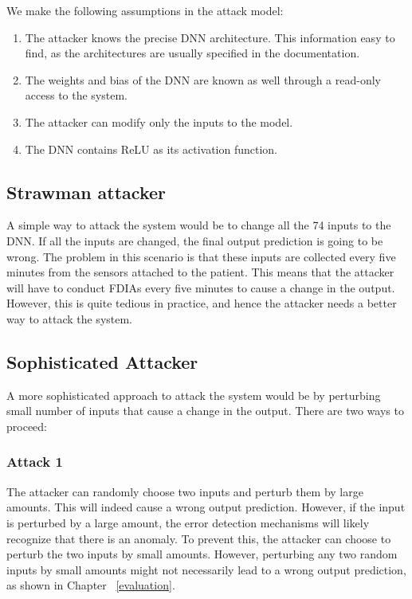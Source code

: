 We make the following assumptions in the attack model:
\begin{enumerate}
	\item The attacker knows the precise \ac{DNN}  architecture. This information easy to find, as the architectures are  usually specified in the  documentation. 
	\item  The weights and bias of the \ac{DNN}  are known as well through a read-only access to the system.  
	\item The attacker can modify only the inputs to the model.
	\item The \ac{DNN} contains ReLU as its activation function. 
\end{enumerate}

\subsection{Strawman attacker}
A simple way to attack the system would be to change all the 74 inputs to the DNN.
 If all the inputs are changed, the final output prediction is going to be wrong. The problem in this  scenario is that 
 these inputs are collected every five minutes from the sensors attached to the patient. 
 This means that the attacker will have to conduct FDIAs every five minutes to cause a change in the output. 
 However, this is quite tedious in practice, and hence the attacker needs a better way to attack the system. 

\subsection{Sophisticated Attacker}
A more sophisticated approach to attack the system would be by perturbing small number of inputs that cause a change in the output. 
There are two ways to proceed:

\subsubsection{Attack 1}
The attacker can randomly choose two inputs and perturb them by large amounts. 
This will indeed cause a wrong output prediction. 
However, if the input is perturbed by a large amount, the error detection mechanisms will likely recognize that there is an anomaly. 
To prevent this, the attacker can choose to perturb the two inputs by small amounts. 
However, perturbing any two random inputs by small amounts might not necessarily lead to a wrong output prediction, as shown in Chapter ~\ref{evaluation}. 

